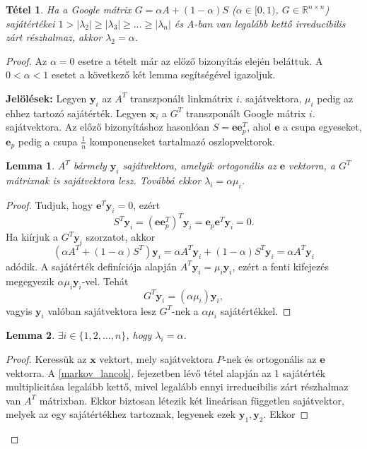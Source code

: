 \documentclass[12pt,a4paper]{article}
\newcommand{\bx}{\mathbf{x}}
\newcommand{\be}{\mathbf{e}}
\newcommand{\by}{\mathbf{y}}
\newtheorem{tetel}{Tétel}
\newtheorem{lemma}{Lemma}[tetel]
\begin{document}
\begin{tetel}
	Ha a Google mátrix $G = \alpha A + (1-\alpha)S$ ($\alpha \in [0,1)$, $G \in \mathbb{R}^{n \times n}$) sajátértékei $ 1 > |\lambda_2| \geq |\lambda_3| \geq \ldots \geq |\lambda_n |$ és $A$-ban van legalább kettő irreducibilis zárt részhalmaz, akkor $\lambda_2 = \alpha$.
\end{tetel}
\begin{proof}
	Az $\alpha = 0$ esetre a tételt már az előző bizonyítás elején beláttuk. A $0 < \alpha < 1$ esetet a következő két lemma segítségével igazoljuk.
	
	\vspace{0.1cm}
	\textbf{Jelölések:} Legyen $\by_i$ az $A^T$ transzponált linkmátrix $i$. sajátvektora, $\mu_i$ pedig az ehhez tartozó sajátérték. Legyen $\bx_i$ a $G^T$ transzponált Google mátrix $i$. sajátvektora. Az előző bizonyításhoz hasonlóan $S = \be \be_p^T$, ahol $\be$ a csupa egyeseket, $\be_p$ pedig a csupa $\frac{1}{n}$ komponenseket tartalmazó oszlopvektorok.
	
	\begin{lemma}
		$A^T$ bármely $\by_i$ sajátvektora, amelyik ortogonális az $\be$ vektorra, a $G^T$ mátrixnak is sajátvektora lesz. Továbbá ekkor $\lambda_i = \alpha \mu_i$.
	\end{lemma}
	\vspace{-0.5cm}
	\begin{proof}
		Tudjuk, hogy $\be^T \by_i = 0$, ezért
		\[ S^T \by_i = (\be \be_p^T)^T \by_i = \be_p \be^T \by_i = 0. \]
		Ha kiírjuk a $G^T \by_i$ szorzatot, akkor
		\[ (\alpha A^T + (1-\alpha) S^T ) \by_i = \alpha A^T \by_i + (1-\alpha) S^T \by_i = \alpha A^T \by_i \]
		adódik. A sajátérték definíciója alapján $A^T \by_i = \mu_i \by_i$, ezért a fenti kifejezés megegyezik $\alpha \mu_i \by_i$-vel. Tehát
		\[ G^T \by_i = (\alpha \mu_i) \by_i, \]
		vagyis $\by_i$ valóban sajátvektora lesz $G^T$-nek a $\alpha \mu_i$ sajátértékkel.
	\end{proof} 

	\begin{lemma}
		$\exists i \in \{ 1,2,\ldots,n \}$, hogy $\lambda_i = \alpha$.
	\end{lemma}
	\vspace{-0.5cm}
	\begin{proof}
		Keressük az $\bx$ vektort, mely sajátvektora $P$-nek és ortogonális az $\be$ vektorra. A \ref{markov_lancok}. fejezetben lévő tétel alapján az 1 sajátérték multiplicitása legalább kettő, mivel legalább ennyi irreducibilis zárt részhalmaz van $A^T$ mátrixban. Ekkor biztosan létezik két lineárisan független sajátvektor, melyek az egy sajátértékhez tartoznak, legyenek ezek $\by_1,\by_2$. Ekkor
		

\end{proof}
\end{proof}
\end{document}
